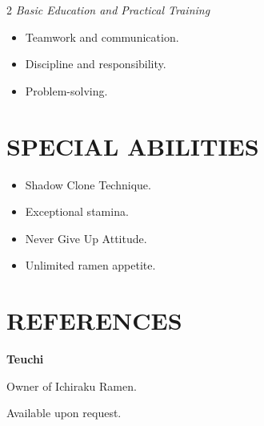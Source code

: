 \documentclass[10pt,a4paper]{article}
\begin{document}
\begin{paracol}{2}
\textit{Basic Education and Practical Training}

\begin{itemize}
    \item Teamwork and communication.
    \item Discipline and responsibility.
    \item Problem-solving.
\end{itemize}

\section*{SPECIAL ABILITIES}

\begin{itemize}
    \item Shadow Clone Technique.
    \item Exceptional stamina.
    \item Never Give Up Attitude.
    \item Unlimited ramen appetite.
\end{itemize}

\section*{REFERENCES}

\textbf{Teuchi}

Owner of Ichiraku Ramen.

Available upon request.

\end{paracol}
\end{document}
